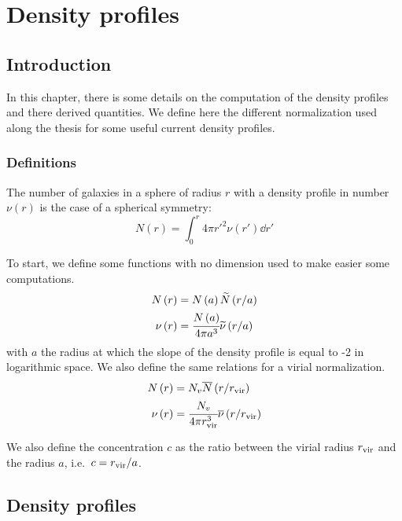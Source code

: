 \chapter{Density profiles}
\label{cha:profiles}

\section{Introduction}

In this chapter, there is some details on the computation of the density
profiles and there derived quantities. We define here the different
normalization used along the thesis for some useful current density profiles.

\subsection{Definitions}

The number of galaxies in a sphere of radius $r$ with a density profile in
number $\nu(r)$ is the case of a spherical symmetry:
%
\begin{equation}
    N\left(r\right)=\int_0^r4\pi {r'}^2 \nu(r')\dd{r'}
\end{equation}

To start, we define some functions with no dimension used to make easier some
computations.
%
\begin{eqnarray}
    N\left(r\right)&=N\left(a\right){\widetilde{N}\left(r/a\right)}\nonumber\\
    \nu\left(r\right)&=
        \cfrac{N\left(a\right)}{4\pi{a^3}}
        \widetilde\nu\left(r/a\right)\nonumber\\
\end{eqnarray}
%
with $a$ the radius at which the slope of the density profile is equal to -2 in
logarithmic space. We also define the same relations for a virial
normalization.
%
\begin{eqnarray}
    N\left(r\right)&={N_v}{\overline{N}\left(r/r_{\rm vir}\right)}\nonumber\\
    \nu\left(r\right)&=
        \cfrac{N_v}{4\pi r_{\rm vir}^3}\overline\nu\left(r/r_{\rm vir}\right)\nonumber\\
\end{eqnarray}

We also define the concentration $c$ as the ratio between the virial radius
$r_{\rm vir}$ and the radius $a$, i.e.\ $c=r_{\rm vir}/a$.

\section{Density profiles}
\label{sec:density_profiles}

